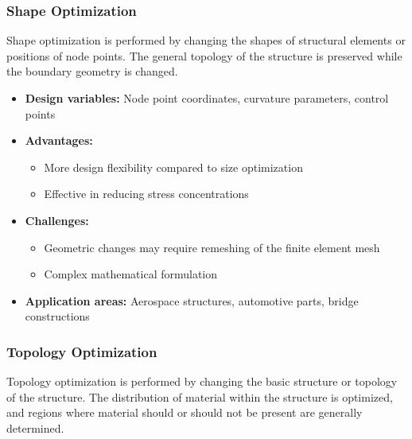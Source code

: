 \subsubsection{Shape Optimization}
Shape optimization is performed by changing the shapes of structural elements or positions of node points. The general topology of the structure is preserved while the boundary geometry is changed.

\begin{itemize}
    \item \textbf{Design variables:} Node point coordinates, curvature parameters, control points
    \item \textbf{Advantages:} 
    \begin{itemize}
        \item More design flexibility compared to size optimization
        \item Effective in reducing stress concentrations
    \end{itemize}
    \item \textbf{Challenges:} 
    \begin{itemize}
        \item Geometric changes may require remeshing of the finite element mesh
        \item Complex mathematical formulation
    \end{itemize}
    \item \textbf{Application areas:} Aerospace structures, automotive parts, bridge constructions
\end{itemize}

\subsubsection{Topology Optimization}
Topology optimization is performed by changing the basic structure or topology of the structure. The distribution of material within the structure is optimized, and regions where material should or should not be present are generally determined.

